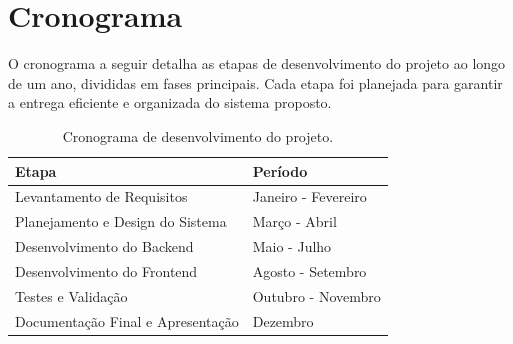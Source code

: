 \documentclass[../main.tex]{subfiles}
\begin{document}
\section{Cronograma}
O cronograma a seguir detalha as etapas de desenvolvimento do projeto ao longo de um ano, divididas em fases principais. Cada etapa foi planejada para garantir a entrega eficiente e organizada do sistema proposto.


\begin{table}[H] 
    \centering
    \begin{tabular}{|p{6cm}|p{6cm}|}
        \hline
        \textbf{Etapa} & \textbf{Período} \\ \hline
        Levantamento de Requisitos & Janeiro - Fevereiro \\ \hline
        Planejamento e Design do Sistema & Março - Abril \\ \hline
        Desenvolvimento do Backend & Maio - Julho \\ \hline
        Desenvolvimento do Frontend & Agosto - Setembro \\ \hline
        Testes e Validação & Outubro - Novembro \\ \hline
        Documentação Final e Apresentação & Dezembro \\ \hline
    \end{tabular}
    \caption{Cronograma de desenvolvimento do projeto.}
    \label{tab:cronograma}
\end{table}
\end{document}
